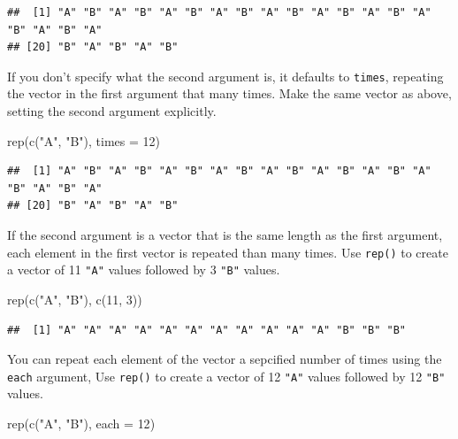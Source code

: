 \documentclass[
  oneside]{book}
\newenvironment{Shaded}{\begin{snugshade}}{\end{snugshade}}
\newcommand{\AttributeTok}[1]{\textcolor[rgb]{0.77,0.63,0.00}{#1}}
\newcommand{\DecValTok}[1]{\textcolor[rgb]{0.00,0.00,0.81}{#1}}
\newcommand{\FunctionTok}[1]{\textcolor[rgb]{0.00,0.00,0.00}{#1}}
\newcommand{\NormalTok}[1]{#1}
\newcommand{\StringTok}[1]{\textcolor[rgb]{0.31,0.60,0.02}{#1}}
\begin{document}
\begin{verbatim}
##  [1] "A" "B" "A" "B" "A" "B" "A" "B" "A" "B" "A" "B" "A" "B" "A" "B" "A" "B" "A"
## [20] "B" "A" "B" "A" "B"
\end{verbatim}

If you don't specify what the second argument is, it defaults to \texttt{times}, repeating the vector in the first argument that many times. Make the same vector as above, setting the second argument explicitly.

\begin{Shaded}
\begin{Highlighting}[]
\FunctionTok{rep}\NormalTok{(}\FunctionTok{c}\NormalTok{(}\StringTok{"A"}\NormalTok{, }\StringTok{"B"}\NormalTok{), }\AttributeTok{times =} \DecValTok{12}\NormalTok{)}
\end{Highlighting}
\end{Shaded}

\begin{verbatim}
##  [1] "A" "B" "A" "B" "A" "B" "A" "B" "A" "B" "A" "B" "A" "B" "A" "B" "A" "B" "A"
## [20] "B" "A" "B" "A" "B"
\end{verbatim}

If the second argument is a vector that is the same length as the first argument, each element in the first vector is repeated than many times. Use \texttt{rep()} to create a vector of 11 \texttt{"A"} values followed by 3 \texttt{"B"} values.

\begin{Shaded}
\begin{Highlighting}[]
\FunctionTok{rep}\NormalTok{(}\FunctionTok{c}\NormalTok{(}\StringTok{"A"}\NormalTok{, }\StringTok{"B"}\NormalTok{), }\FunctionTok{c}\NormalTok{(}\DecValTok{11}\NormalTok{, }\DecValTok{3}\NormalTok{))}
\end{Highlighting}
\end{Shaded}

\begin{verbatim}
##  [1] "A" "A" "A" "A" "A" "A" "A" "A" "A" "A" "A" "B" "B" "B"
\end{verbatim}

You can repeat each element of the vector a sepcified number of times using the \texttt{each} argument, Use \texttt{rep()} to create a vector of 12 \texttt{"A"} values followed by 12 \texttt{"B"} values.

\begin{Shaded}
\begin{Highlighting}[]
\FunctionTok{rep}\NormalTok{(}\FunctionTok{c}\NormalTok{(}\StringTok{"A"}\NormalTok{, }\StringTok{"B"}\NormalTok{), }\AttributeTok{each =} \DecValTok{12}\NormalTok{)}
\end{Highlighting}
\end{Shaded}
\end{document}

